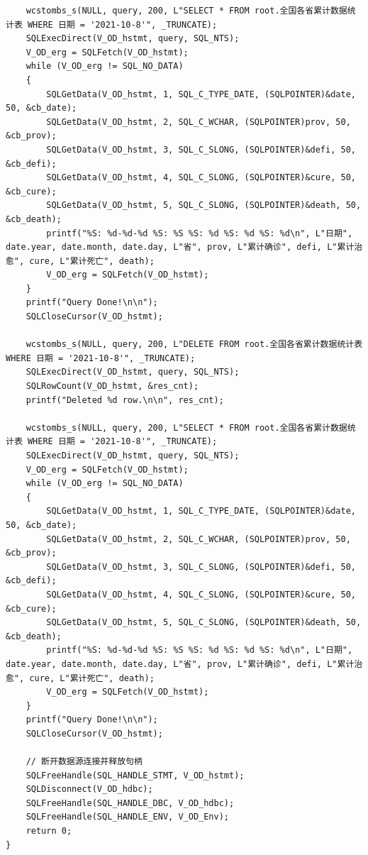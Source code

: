 \documentclass[lang=cn,11pt,a4paper,cite=authornum]{paper}
\begin{document}
\begin{code}
\begin{verbatim}
    wcstombs_s(NULL, query, 200, L"SELECT * FROM root.全国各省累计数据统计表 WHERE 日期 = '2021-10-8'", _TRUNCATE);
    SQLExecDirect(V_OD_hstmt, query, SQL_NTS);
    V_OD_erg = SQLFetch(V_OD_hstmt);
    while (V_OD_erg != SQL_NO_DATA)
    {
        SQLGetData(V_OD_hstmt, 1, SQL_C_TYPE_DATE, (SQLPOINTER)&date, 50, &cb_date);
        SQLGetData(V_OD_hstmt, 2, SQL_C_WCHAR, (SQLPOINTER)prov, 50, &cb_prov);
        SQLGetData(V_OD_hstmt, 3, SQL_C_SLONG, (SQLPOINTER)&defi, 50, &cb_defi);
        SQLGetData(V_OD_hstmt, 4, SQL_C_SLONG, (SQLPOINTER)&cure, 50, &cb_cure);
        SQLGetData(V_OD_hstmt, 5, SQL_C_SLONG, (SQLPOINTER)&death, 50, &cb_death);
        printf("%S: %d-%d-%d %S: %S %S: %d %S: %d %S: %d\n", L"日期", date.year, date.month, date.day, L"省", prov, L"累计确诊", defi, L"累计治愈", cure, L"累计死亡", death);
        V_OD_erg = SQLFetch(V_OD_hstmt);
    }
    printf("Query Done!\n\n");
    SQLCloseCursor(V_OD_hstmt);

    wcstombs_s(NULL, query, 200, L"DELETE FROM root.全国各省累计数据统计表 WHERE 日期 = '2021-10-8'", _TRUNCATE);
    SQLExecDirect(V_OD_hstmt, query, SQL_NTS);
    SQLRowCount(V_OD_hstmt, &res_cnt);
    printf("Deleted %d row.\n\n", res_cnt);

    wcstombs_s(NULL, query, 200, L"SELECT * FROM root.全国各省累计数据统计表 WHERE 日期 = '2021-10-8'", _TRUNCATE);
    SQLExecDirect(V_OD_hstmt, query, SQL_NTS);
    V_OD_erg = SQLFetch(V_OD_hstmt);
    while (V_OD_erg != SQL_NO_DATA)
    {
        SQLGetData(V_OD_hstmt, 1, SQL_C_TYPE_DATE, (SQLPOINTER)&date, 50, &cb_date);
        SQLGetData(V_OD_hstmt, 2, SQL_C_WCHAR, (SQLPOINTER)prov, 50, &cb_prov);
        SQLGetData(V_OD_hstmt, 3, SQL_C_SLONG, (SQLPOINTER)&defi, 50, &cb_defi);
        SQLGetData(V_OD_hstmt, 4, SQL_C_SLONG, (SQLPOINTER)&cure, 50, &cb_cure);
        SQLGetData(V_OD_hstmt, 5, SQL_C_SLONG, (SQLPOINTER)&death, 50, &cb_death);
        printf("%S: %d-%d-%d %S: %S %S: %d %S: %d %S: %d\n", L"日期", date.year, date.month, date.day, L"省", prov, L"累计确诊", defi, L"累计治愈", cure, L"累计死亡", death);
        V_OD_erg = SQLFetch(V_OD_hstmt);
    }
    printf("Query Done!\n\n");
    SQLCloseCursor(V_OD_hstmt);

    // 断开数据源连接并释放句柄
    SQLFreeHandle(SQL_HANDLE_STMT, V_OD_hstmt);
    SQLDisconnect(V_OD_hdbc);
    SQLFreeHandle(SQL_HANDLE_DBC, V_OD_hdbc);
    SQLFreeHandle(SQL_HANDLE_ENV, V_OD_Env);
    return 0;
}
\end{verbatim}
\end{code}
\end{document}

